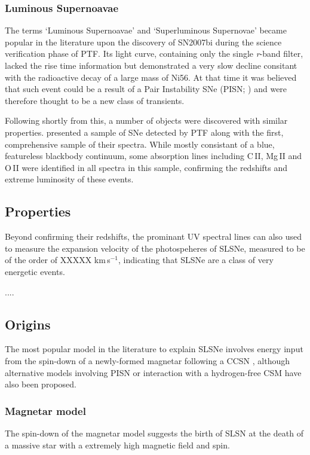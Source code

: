 \subsubsection{Luminous Supernoavae}
The terms `Luminous Supernoavae' and `Superluminous Supernovae' became popular in the literature upon the discovery of SN2007bi \citep{Gal-Yam2009} during the science verification phase of PTF. Its light curve, containing only the single \textit{r}-band filter, lacked the rise time information but demonstrated a very slow decline consitant with the radioactive decay of a large mass of Ni56. At that time it was believed that such event could be a result of a Pair Instability SNe (PISN; ) and were therefore thought to be a new class of transients.

Following shortly from this, a number of objects were discovered with similar properties. \citet{Quimby2009} presented a sample of SNe detected by PTF along with the first, comprehensive sample of their spectra. While mostly consistant of a blue, featureless blackbody continuum, some absorption lines including C\,II, Mg\,II and O\,II were identified in all spectra in this sample, confirming the redshifts and extreme luminosity of these events.

\subsection{Properties}
Beyond confirming their redshifts, the prominant UV spectral lines can also used to measure the expansion velocity of the photospeheres of SLSNe, measured to be of the order of XXXXX km\,s$^{-1}$, indicating that SLSNe are a class of very energetic events.

....

\subsection{Origins} \label{sec:Origins}
The most popular model in the literature to explain SLSNe involves energy input from the spin-down of a newly-formed magnetar following a CCSN \citep{2010ApJ...717..245K,2010ApJ...719L.204W,2013ApJ...770..128I}, although alternative models involving PISN \citep{2007Natur.450..390W,2015ApJ...814..108Y} or interaction with a hydrogen-free CSM \citep{2011ApJ...729L...6C,2013ApJ...773...76C,2015arXiv151000834S} have also been proposed.

\subsubsection{Magnetar model}
The spin-down of the magnetar model suggests the birth of SLSN at the death of a massive star with a extremely high magnetic field and spin.

